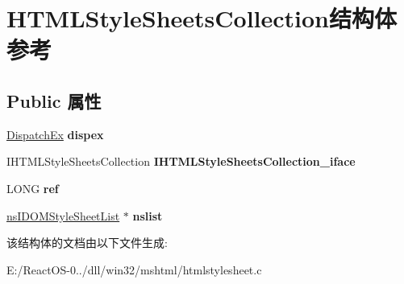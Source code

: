 \hypertarget{struct_h_t_m_l_style_sheets_collection}{}\section{H\+T\+M\+L\+Style\+Sheets\+Collection结构体 参考}
\label{struct_h_t_m_l_style_sheets_collection}
\subsection*{Public 属性}
\begin{DoxyCompactItemize}
\item 
\mbox{\label{struct_h_t_m_l_style_sheets_collection_a410aba2d55779ec92f6e4335f8750ffa}} 
\hyperlink{struct_dispatch_ex}{Dispatch\+Ex} {\bfseries dispex}
\item 
\mbox{\label{struct_h_t_m_l_style_sheets_collection_a9a0163af405c3c50966bc0c1eac4bdfb}} 
I\+H\+T\+M\+L\+Style\+Sheets\+Collection {\bfseries I\+H\+T\+M\+L\+Style\+Sheets\+Collection\+\_\+iface}
\item 
\mbox{\label{struct_h_t_m_l_style_sheets_collection_a9d9232f608c607257dc82bdeefe36497}} 
L\+O\+NG {\bfseries ref}
\item 
\mbox{\label{struct_h_t_m_l_style_sheets_collection_a538e6fdc47417b67090756c535327f8a}} 
\hyperlink{interfacens_i_d_o_m_style_sheet_list}{ns\+I\+D\+O\+M\+Style\+Sheet\+List} $\ast$ {\bfseries nslist}
\end{DoxyCompactItemize}


该结构体的文档由以下文件生成\+:\begin{DoxyCompactItemize}
\item 
E\+:/\+React\+O\+S-\/0../dll/win32/mshtml/htmlstylesheet.\+c\end{DoxyCompactItemize}
